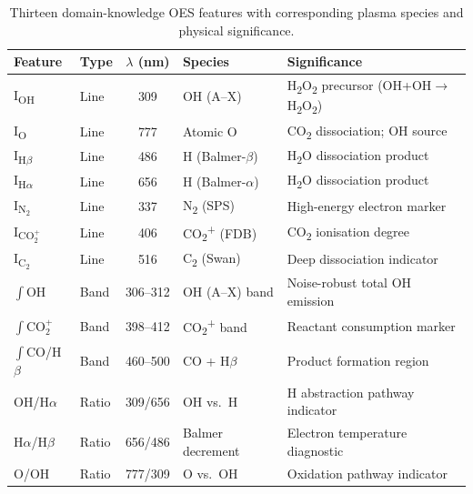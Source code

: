 \documentclass[12pt, a4paper]{article}
\begin{document}
\begin{table}[H]
    \centering
    \small
    \caption{Thirteen domain-knowledge OES features with corresponding plasma species and physical significance. }
    \label{tab:oes_features}
    \begin{tabular}{llcll}
        \toprule
        \textbf{Feature} & \textbf{Type} & \textbf{$\lambda$ (nm)} & \textbf{Species} & \textbf{Significance} \\
        \midrule
        I\textsubscript{OH}        & Line  & 309     & OH (A--X)            & H\textsubscript{2}O\textsubscript{2} precursor (OH+OH$\to$H\textsubscript{2}O\textsubscript{2}) \\
        I\textsubscript{O}         & Line  & 777     & Atomic O             & CO\textsubscript{2} dissociation; OH source \\
        I\textsubscript{H$\beta$}  & Line  & 486     & H (Balmer-$\beta$)   & H\textsubscript{2}O dissociation product \\
        I\textsubscript{H$\alpha$} & Line  & 656     & H (Balmer-$\alpha$)  & H\textsubscript{2}O dissociation product \\
        I\textsubscript{N$_2$}     & Line  & 337     & N\textsubscript{2} (SPS)  & High-energy electron marker\cite{Paris2005N2Ratio} \\
        I\textsubscript{CO$_2^+$}  & Line  & 406     & CO\textsubscript{2}\textsuperscript{+} (FDB)  & CO\textsubscript{2} ionisation degree \\
        I\textsubscript{C$_2$}     & Line  & 516     & C\textsubscript{2} (Swan) & Deep dissociation indicator\cite{Gao2024NSCO2Discharge} \\
        \midrule
        $\int$OH                   & Band  & 306--312 & OH (A--X) band      & Noise-robust total OH emission \\
        $\int$CO$_2^+$             & Band  & 398--412 & CO\textsubscript{2}\textsuperscript{+} band & Reactant consumption marker \\
        $\int$CO/H$\beta$          & Band  & 460--500 & CO + H$\beta$       & Product formation region \\
        \midrule
        OH/H$\alpha$               & Ratio & 309/656  & OH vs.\ H           & H abstraction pathway indicator \\
        H$\alpha$/H$\beta$         & Ratio & 656/486  & Balmer decrement    & Electron temperature diagnostic~\cite{Laux2003OESAir}\cite{Griem1997PlasmaSpectroscopy} \\
        O/OH                       & Ratio & 777/309  & O vs.\ OH           & Oxidation pathway indicator \\
        \bottomrule
    \end{tabular}
\end{table}
\end{document}
